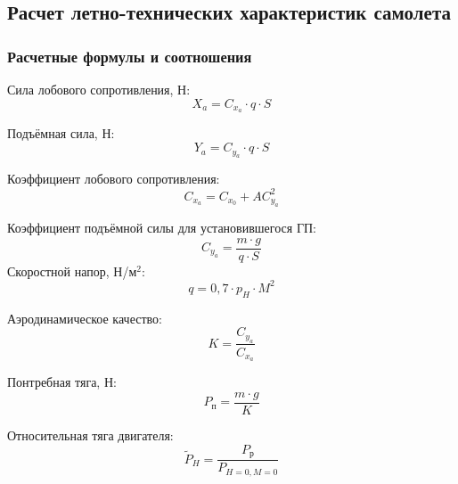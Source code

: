 \subsection{Расчет летно-технических характеристик самолета}
\label{sec:Расчет летно-технических характеристик самолета}
\subsubsection{Расчетные формулы и соотношения}
\pagestyle{fancy}
\fancyhf{}
\rfoot{\thepage}


Сила лобового сопротивления, Н: 
\begin{equation}
    \label{eq:Сила лобового сопротивления}
    X_a = C_{x_a} \cdot q \cdot S
\end{equation}

Подъёмная сила, Н: 
\begin{equation}
    \label{eq:Подъёмная сила}
    Y_a = C_{y_a} \cdot q \cdot S
\end{equation}

Коэффициент лобового сопротивления: 
\begin{equation}
    \label{eq:коэффициент лобового сопротивления}
    C_{x_a} = C_{x_0} + AC_{y_a}^2
\end{equation}

Коэффициент подъёмной силы для установившегося ГП: 
\begin{equation}
    \label{eq:Коэффициент подъёмной силы для установившегося ГП}
    C_{y_a} = \frac{m \cdot g}{q \cdot S}
\end{equation}
Скоростной напор, Н/м$^2$: 
\begin{equation}
    \label{eq:Скоростной напор}
    q = 0,7 \cdot p_H \cdot M^2
\end{equation}

Аэродинамическое качество: 
\begin{equation}
    \label{eq:Аэродинамическое качество}
    K = \frac{C_{y_a}}{C_{x_a}}
\end{equation}

Понтребная тяга, Н: 
\begin{equation}
    \label{eq:Понтребная тяга}
    P_\text{п} = \frac{m \cdot g}{K}
\end{equation}

Относительная тяга двигателя: 
\begin{equation}
    \label{Относительная тяга двигателя}
    \tilde{P}_H = \frac{P_\text{р}}{P_{H=0,M=0}}
\end{equation}


